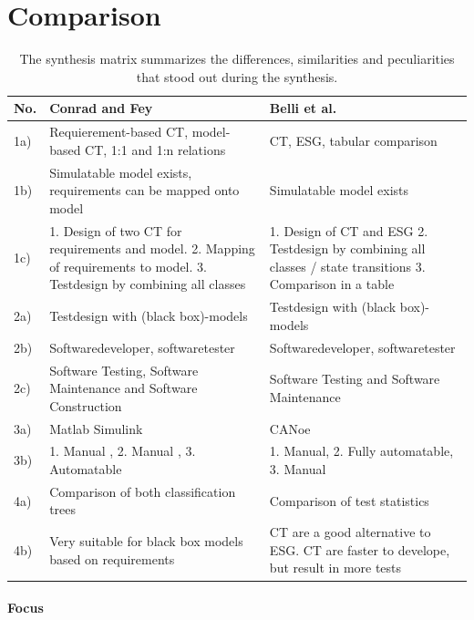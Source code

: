 \section{Comparison}
\label{Kap:Comparison}

\begin{small} 		
	\begin{longtable}[h]{p{0.45cm}|p{}|p{}}
	\caption{The synthesis matrix summarizes the differences, similarities and peculiarities that stood out during the synthesis.}
	\label{tab:synthesematrix_julian}
	\\    %
	\hline
	\textbf{No.} & \textbf{Conrad and Fey} & \textbf{Belli et al.} \\
	\hline
	1a) & Requierement-based CT, model-based CT,  1:1 and 1:n relations & CT, ESG, tabular comparison \\
	\hline	
	1b) & Simulatable model exists, requirements can be mapped onto model & Simulatable model exists \\
	\hline	
	1c) & 1. Design of two CT for requirements and model. 2. Mapping of requirements to model. 3. Testdesign by combining all classes & 1. Design of CT and ESG 2. Testdesign by combining all classes / state transitions 3. Comparison in a table\\
	\hline	
	2a) & Testdesign with (black box)-models & Testdesign with (black box)-models \\
	\hline	
	2b) & Softwaredeveloper, softwaretester & Softwaredeveloper, softwaretester  \\
	\hline	
	2c) & Software Testing, Software Maintenance and Software Construction & Software Testing and Software Maintenance \\
	\hline
	3a) & Matlab Simulink & CANoe \\
	\hline
	3b) & 1. Manual , 2. Manual , 3. Automatable & 1. Manual, 2. Fully automatable, 3. Manual \\
	\hline	
	4a) & Comparison of both classification trees & 
	Comparison of test statistics \\
	\hline	
	4b) & Very suitable for black box models based on requirements & CT are a good alternative to ESG. CT are faster to develope, but result in more tests \\
	\hline	
	\end{longtable}
\end{small}

\newpage
\paragraph{Focus}


